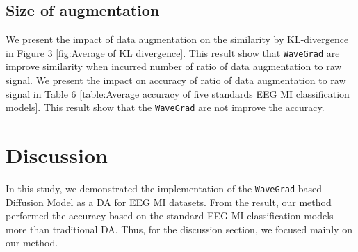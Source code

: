 \documentclass[12pt]{iopart}
\begin{document}
\begin{table}[ht] 
\centering
\caption{\label{table:Average accuracy of five standards EEG MI classification models} Average accuracy of five standards EEG MI classification models}
\end{table}

\subsection{Size of augmentation}
We present the impact of data augmentation on the similarity by KL-divergence in Figure 3 \ref{fig:Average of KL divergence}. This result show that \texttt{WaveGrad} are improve similarity when incurred number of ratio of data augmentation to raw signal.
We present the impact on accuracy of ratio of data augmentation to raw signal  in Table 6 \ref{table:Average accuracy of five standards EEG MI classification models}. This result show that the \texttt{WaveGrad} are not improve the accuracy.




\section{Discussion}
In this study, we demonstrated the implementation of the \texttt{WaveGrad}-based Diffusion Model as a DA for EEG MI datasets. From the result, our method performed the accuracy based on the standard EEG MI classification models more than traditional DA. Thus, for the discussion section, we focused mainly on our method.
\end{document}
